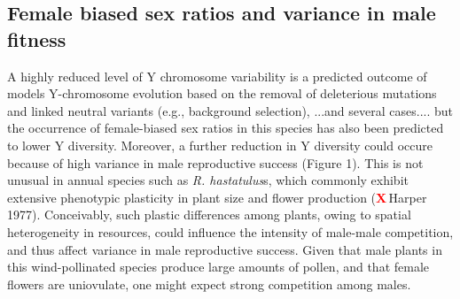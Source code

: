 \documentclass[9pt,twocolumn,twoside]{gsajnl}
\newcommand{\X}{\textcolor{red}{\bf X\,}}
\begin{document}



\subsection*{Female biased sex ratios and variance in male fitness}

 A highly reduced level of Y chromosome variability is a predicted outcome of models Y-chromosome evolution based on the removal of deleterious mutations and linked neutral variants (e.g., background selection), ...and several cases.... but the occurrence of female-biased sex ratios in this species has also been predicted to lower Y diversity. Moreover, a further reduction in Y diversity could occure because of high variance in male reproductive success (Figure 1). This is not unusual in annual species such as \textit{R. hastatulus}s, which commonly exhibit extensive phenotypic plasticity in plant size and flower production (\X Harper 1977). Conceivably, such plastic differences among plants, owing to spatial heterogeneity in resources, could influence the intensity of male-male competition, and thus affect variance in male reproductive success. Given that male plants in this wind-pollinated species produce large amounts of pollen, and that female flowers are uniovulate, one might expect strong competition among males. 
 
\end{document}

